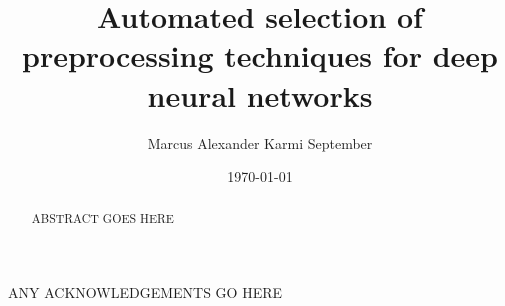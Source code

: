 \documentclass{statsmsc}
\title{Automated selection of preprocessing techniques for deep neural networks}
\author{Marcus Alexander Karmi September}
\date{\today}
\begin{document}

\maketitle


\declarationdate{\today}
\declaration


\begin{abstract}
    ABSTRACT GOES HERE
\end{abstract}

\begin{acknowledgements}
    ANY ACKNOWLEDGEMENTS GO HERE
\end{acknowledgements}

{\thispagestyle{plain}
    \tableofcontents
}
\end{document}
